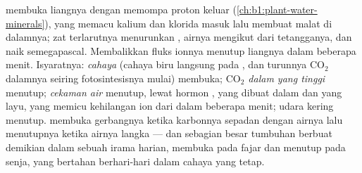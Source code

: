 \begin{proposition}\label{prop:b1:plant-transport:opening}
 membuka liangnya dengan memompa proton keluar
(\cref{ch:b1:plant-water-minerals}), yang memacu kalium dan klorida
masuk lalu membuat malat di dalamnya; zat terlarutnya menurunkan
, airnya mengikut dari  tetangganya, dan 
naik semegapascal. Membalikkan fluks ionnya menutup liangnya dalam
beberapa menit. Isyaratnya: \emph{cahaya} (cahaya biru langsung pada
, dan turunnya $\mathrm{CO_2}$ dalamnya seiring
fotosintesisnya mulai) membuka; \emph{$\mathrm{CO_2}$ dalam yang
tinggi} menutup; \emph{cekaman air} menutup, lewat hormon \emph{}, yang dibuat dalam  dan  yang layu, yang memicu
kehilangan ion dari  dalam beberapa menit; udara kering
menutup.  membuka gerbangnya ketika karbonnya sepadan dengan
airnya lalu menutupnya ketika airnya langka --- dan sebagian besar
tumbuhan berbuat demikian dalam sebuah irama harian, membuka pada
fajar dan menutup pada senja, yang bertahan berhari-hari dalam cahaya
yang tetap.
\end{proposition}

